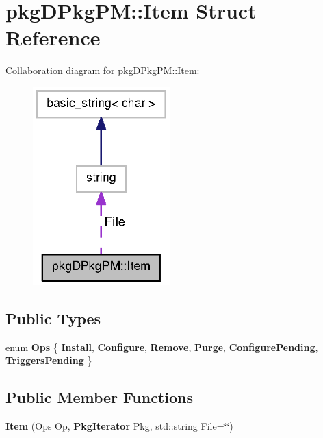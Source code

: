 \section{pkg\-D\-Pkg\-P\-M\-:\-:\-Item \-Struct \-Reference}
\label{structpkgDPkgPM_1_1Item}


\-Collaboration diagram for pkg\-D\-Pkg\-P\-M\-:\-:\-Item\-:
\nopagebreak
\begin{figure}[H]
\begin{center}
\leavevmode
\includegraphics[width=150pt]{structpkgDPkgPM_1_1Item__coll__graph}
\end{center}
\end{figure}
\subsection*{\-Public \-Types}
\begin{DoxyCompactItemize}
\item 
enum {\bfseries \-Ops} \{ \*
{\bfseries \-Install}, 
{\bfseries \-Configure}, 
{\bfseries \-Remove}, 
{\bfseries \-Purge}, 
\*
{\bfseries \-Configure\-Pending}, 
{\bfseries \-Triggers\-Pending}
 \}
\end{DoxyCompactItemize}
\subsection*{\-Public \-Member \-Functions}
\begin{DoxyCompactItemize}
\item 
{\bfseries \-Item} (\-Ops \-Op, {\bf \-Pkg\-Iterator} \-Pkg, std\-::string \-File=\char`\"{}\char`\"{})\label{structpkgDPkgPM_1_1Item_a1d4be3cd6c7e4ecb03606ddf06adc247}

\end{DoxyCompactItemize}

